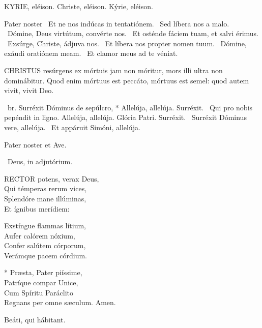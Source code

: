 
KYRIE, eléison. Christe, eléison. Kýrie, eléison.

Pater noster  \V\ Et ne nos indúcas in tentatiónem. \R\ Sed líbera nos a malo. \V\ Dómine, Deus virtútum, convérte nos. \R\ Et osténde fáciem tuam, et salvi érimus. \V\ Exsúrge, Christe, ádjuva nos. \R\ Et líbera nos propter nomen tuum. \V\ Dómine, exáudi oratiónem meam. \R\ Et clamor meus ad te véniat.




\lettrine[lines=2]{C}{HRISTUS} resúrgens ex mórtuis jam non móritur, mors illi ultra non dominábitur. Quod enim mórtuus est peccáto, mórtuus est semel: quod autem vivit, vivit Deo.

\R\ br. Surréxit Dóminus de sepúlcro, * Allelúja, allelúja. Surréxit. \V\ Qui pro nobis pepéndit in ligno. Allelúja, allelúja. Glória Patri. Surréxit. \V\ Surréxit Dóminus vere, allelúja. \R\ Et appáruit Simóni, allelúja.


\sectionornament


Pater noster et Ave.

\V\ Deus, in adjutórium.


\lettrine[lines=2]{R}{ECTOR} potens, verax Deus,\\
Qui témperas rerum vices,\\
Splendóre mane illúminas,\\
Et ígnibus merídiem:

Exstíngue flammas lítium,\\
Aufer calórem nóxium,\\
Confer salútem córporum,\\
Verámque pacem córdium.

* Præsta, Pater piíssime,\\
Patríque compar Unice,\\
Cum Spíritu Paráclito\\
Regnans per omne sæculum. Amen.

  Beáti, qui hábitant.


